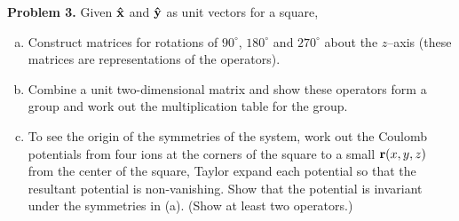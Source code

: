 \documentclass{article}
\begin{document}
\textbf{Problem 3.} Given $\vu{x}$ and $\vu{y}$ as unit vectors for a square,
\begin{enumerate}[(a)]
    \item Construct matrices for rotations of $90^\circ$, $180^\circ$ and $270^\circ$ about the $z$--axis (these matrices are representations of the operators).
    \item Combine a unit two-dimensional matrix and show these operators form a group and work out the multiplication table for the group.
    \item To see the origin of the symmetries of the system, work out the Coulomb potentials from four ions at the corners of the square to a small $\vb{r}(x,y,z)$ from the center of the square, Taylor expand each potential so that the resultant potential is non-vanishing. Show that the potential is invariant under the symmetries in (a). (Show at least two operators.)
\end{enumerate}
\end{document}
